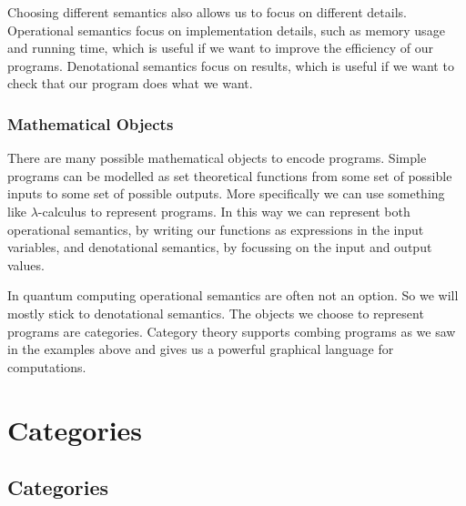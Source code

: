 \documentclass[fleqn]{NotesClass}
\begin{document}
    Choosing different semantics also allows us to focus on different details.
    Operational semantics focus on implementation details, such as memory usage and running time, which is useful if we want to improve the efficiency of our programs.
    Denotational semantics focus on results, which is useful if we want to check that our program does what we want.
    
    \section{Mathematical Objects}
    There are many possible mathematical objects to encode programs.
    Simple programs can be modelled as set theoretical functions from some set of possible inputs to some set of possible outputs.
    More specifically we can use something like \(\lambda\)-calculus to represent programs.
    In this way we can represent both operational semantics, by writing our functions as expressions in the input variables, and denotational semantics, by focussing on the input and output values.
    
    In quantum computing operational semantics are often not an option.
    So we will mostly stick to denotational semantics.
    The objects we choose to represent programs are categories.
    Category theory supports combing programs as we saw in the examples above and gives us a powerful graphical language for computations.
    
    \part{Categories}
    \chapter{Categories}
\end{document}
